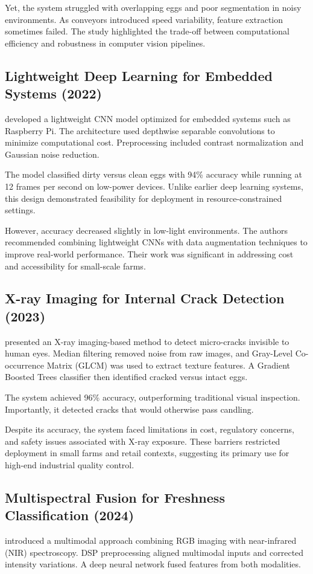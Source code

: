 \documentclass[conference]{IEEEtran}
\begin{document}
	Yet, the system struggled with overlapping eggs and poor segmentation in noisy environments. As conveyors introduced speed variability, feature extraction sometimes failed. The study highlighted the trade-off between computational efficiency and robustness in computer vision pipelines.
	
	\subsection{Lightweight Deep Learning for Embedded Systems (2022)}
	\cite{chen2022lightweight} developed a lightweight CNN model optimized for embedded systems such as Raspberry Pi. The architecture used depthwise separable convolutions to minimize computational cost. Preprocessing included contrast normalization and Gaussian noise reduction.  
	
	The model classified dirty versus clean eggs with 94\% accuracy while running at 12 frames per second on low-power devices. Unlike earlier deep learning systems, this design demonstrated feasibility for deployment in resource-constrained settings.  
	
	However, accuracy decreased slightly in low-light environments. The authors recommended combining lightweight CNNs with data augmentation techniques to improve real-world performance. Their work was significant in addressing cost and accessibility for small-scale farms.
	
	\subsection{X-ray Imaging for Internal Crack Detection (2023)}
	\cite{kumar2023xray} presented an X-ray imaging-based method to detect micro-cracks invisible to human eyes. Median filtering removed noise from raw images, and Gray-Level Co-occurrence Matrix (GLCM) was used to extract texture features. A Gradient Boosted Trees classifier then identified cracked versus intact eggs.  
	
	The system achieved 96\% accuracy, outperforming traditional visual inspection. Importantly, it detected cracks that would otherwise pass candling.  
	
	Despite its accuracy, the system faced limitations in cost, regulatory concerns, and safety issues associated with X-ray exposure. These barriers restricted deployment in small farms and retail contexts, suggesting its primary use for high-end industrial quality control.
	
	\subsection{Multispectral Fusion for Freshness Classification (2024)}
	\cite{garcia2024fusion} introduced a multimodal approach combining RGB imaging with near-infrared (NIR) spectroscopy. DSP preprocessing aligned multimodal inputs and corrected intensity variations. A deep neural network fused features from both modalities.  
	
\end{document}
